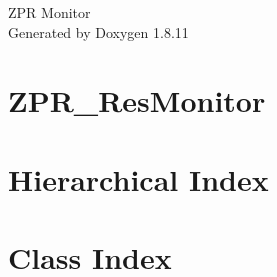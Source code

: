 \documentclass[twoside]{book}
\newcommand{\+}{\discretionary{\mbox{\scriptsize$\hookleftarrow$}}{}{}}
\newcommand{\clearemptydoublepage}{%
  \newpage{\pagestyle{empty}\cleardoublepage}%
}
\begin{document}
\hypersetup{pageanchor=false,
             bookmarksnumbered=true,
             pdfencoding=unicode
            }
\begin{titlepage}
\vspace*{7cm}
\begin{center}%
{\Large Z\+PR Monitor }\\
\vspace*{1cm}
{\large Generated by Doxygen 1.8.11}\\
\end{center}
\end{titlepage}
\clearemptydoublepage
\tableofcontents
\clearemptydoublepage
{}
\hypersetup{pageanchor=true}

\chapter{Z\+P\+R\+\_\+\+Res\+Monitor}
\label{md_README}
\hypertarget{md_README}{}

\chapter{Hierarchical Index}

\chapter{Class Index}

\end{document}
